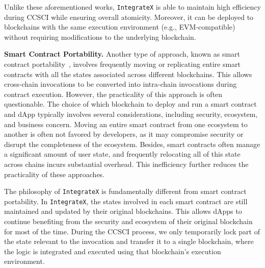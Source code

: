 Unlike these aforementioned works, \texttt{IntegrateX} is able to maintain high efficiency during CCSCI while ensuring overall atomicity. 
Moreover, it can be deployed to blockchains with the same execution environment (e.g., EVM-compatible) without requiring modifications to the underlying blockchain.



\vspace{3pt}
\noindent
\textbf{Smart Contract Portability.}
Another type of approach, known as smart contract portability~\cite{westerkamp2019verifiable,fynn2020smom,westerkamp2022smartsync}, involves frequently moving or replicating entire smart contracts with all the states associated across different blockchains. 
This allows cross-chain invocations to be converted into intra-chain invocations during contract execution. 
However, the practicality of this approach is often questionable. 
The choice of which blockchain to deploy and run a smart contract and dApp typically involves several considerations, including security, ecosystem, and business concern. 
Moving an entire smart contract from one ecosystem to another is often not favored by developers, as it may compromise security or disrupt the completeness of the ecosystem.
Besides, smart contracts often manage a significant amount of user state, and frequently relocating all of this state across chains incurs substantial overhead. 
This inefficiency further reduces the practicality of these approaches.

The philosophy of \texttt{IntegrateX} is fundamentally different from smart contract portability. 
In \texttt{IntegrateX}, the states involved in each smart contract are still maintained and updated by their original blockchains. 
This allows dApps to continue benefiting from the security and ecosystem of their original blockchain for most of the time. 
During the CCSCI process, we only temporarily lock part of the state relevant to the invocation and transfer it to a single blockchain, where the logic is integrated and executed using that blockchain's execution environment.


